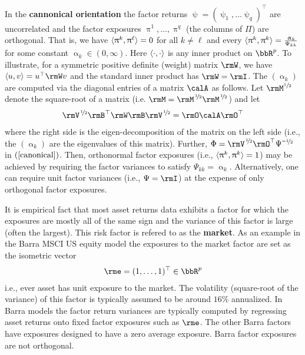\documentclass[leqno,12pt]{article}
\begin{document}
{In the {\bf cannonical orientation} the factor returns
$\uppsi = (\uppsi_1, \dots \uppsi_q)^\top$ are uncorrelated
and the factor exposures $\uppi^1, \dots, \uppi^q$
(the columns of $\Pi$) are orthogonal. That is, we have  
$\langle \uppi^k , \uppi^\ell \rangle = 0$ for all  
$k \neq \ell$ and every $\langle \uppi^k , \uppi^k \rangle = 
\frac{\hspace{1pt} \upalpha_k}{\Psi_{kk}}$ for some constant
$\upalpha_k \in (0,\infty)$.
Here $\langle \cdot , \cdot \rangle$ is any inner product on $\bbR^p$.
To illustrate, for a symmetric positive definite (weight)
matrix $\rmW$, we have $\ip{u}{v} = u^\top \rmW v$ 
and the standard inner product has $\rmW = \rmI$. 
The $(\upalpha_k)$
are computed via the diagonal entries of a matrix $\calA$
as follows. Let $\rmM^{\sfrac{1}{2}}$ 
denote the square-root of a matrix (i.e. 
$\rmM = 
\rmM^{\sfrac{\s 1 \s[-1]}{2}}
\rmM^{\sfrac{\s 1 \s[-1]}{2}}$) and let
\begin{align}
  \rmV^{\sfrac{\s 1\s[-1]}{2}} \rmB^\top \rmW \rmB 
\rmV^{\sfrac{\s 1\s[-1]}{2}} = \rmO \calA \rmO^\top
\end{align}
where the right side is the eigen-decomposition of the 
matrix on the left side (i.e., the $(\upalpha_k)$ are
the eigenvalues of this matrix). Further, $\Phi
= \rmV^{\sfrac{\s1\s[-1]}{2}} 
\rmO^\top \Psi^{\ms\sfrac{1\s[-1]}{2}}$ in 
$\req{canonical}$.
Then, orthonormal factor exposures  
(i.e., $\langle \uppi^k , \uppi^k \rangle = 1$) may be achieved by requiring the factor variances 
to satisfy $\Psi_{kk} = \upalpha_k$. Alternatively, one
can require unit factor variances (i.e., 
$\Psi = \rmI$) at the expense of
only orthogonal factor exposures.


\begin{mdframed}[style=clean]
   It is empirical fact that most asset returns data exhibits
a factor for which the exposures are mostly all of the same
sign and the variance of this factor is large (often 
the largest). This risk factor is refered to as the 
{\bf market}. As an example in the Barra MSCI US equity
model the exposures to the market factor are set as 
the isometric vector
\begin{align}
 \rme = (1, \dots, 1)^\top \in \bbR^p
\end{align}
i.e., ever asset has unit exposure to the market. The volatility
(square-root of the variance) of this factor is typically 
assumed to be around $16\%$ annualized. In Barra models
the factor return variances are typically computed by 
regressing asset returns onto fixed factor exposures such as
$\rme$. The other Barra factors have exposures designed to 
have a zero average exposure. Barra factor exposures
are not orthogonal.
\end{mdframed}

}
\end{document}
